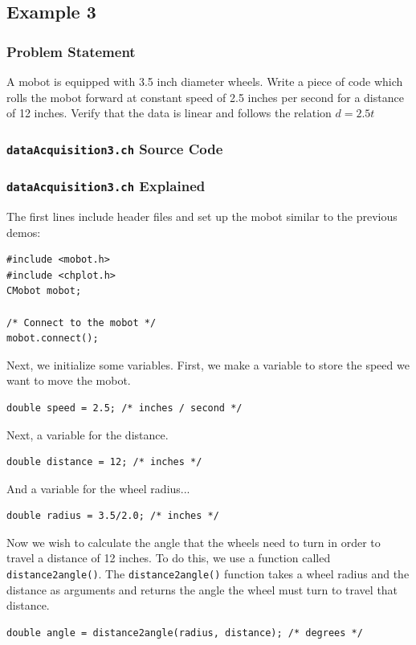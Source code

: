 \documentclass{article}
\begin{document}
\subsection{Example 3}
\subsubsection{Problem Statement}
A mobot is equipped with 3.5 inch diameter wheels. Write a piece of code which rolls the
mobot forward at constant speed of 2.5 inches per second for a distance of 12 inches. 
Verify that the data is linear and follows the relation $d = 2.5t$

\subsubsection{\texttt{dataAcquisition3.ch} Source Code}


\subsubsection{\texttt{dataAcquisition3.ch} Explained}
The first lines include header files and set up the mobot similar to the previous
demos:
\begin{verbatim}
#include <mobot.h>
#include <chplot.h>
CMobot mobot;

/* Connect to the mobot */
mobot.connect();
\end{verbatim}

Next, we initialize some variables. First, we make a variable to store the speed
we want to move the mobot.
\begin{verbatim}
double speed = 2.5; /* inches / second */
\end{verbatim}

Next, a variable for the distance.
\begin{verbatim}
double distance = 12; /* inches */
\end{verbatim}

And a variable for the wheel radius...
\begin{verbatim}
double radius = 3.5/2.0; /* inches */
\end{verbatim}

Now we wish to calculate the angle that the wheels need to turn in order to
travel a distance of 12 inches. To do this, we use a function called
\texttt{distance2angle()}. The \texttt{distance2angle()} function 
takes a wheel radius and the distance as arguments and returns the angle
the wheel must turn to travel that distance. 
\begin{verbatim}
double angle = distance2angle(radius, distance); /* degrees */
\end{verbatim}
\end{document}
